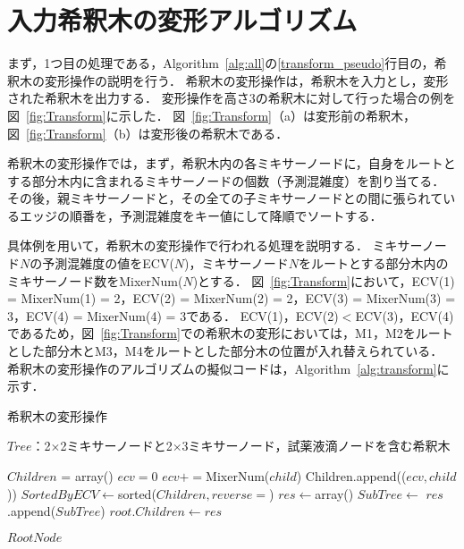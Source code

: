 \section{入力希釈木の変形アルゴリズム}
まず，1つ目の処理である，Algorithm~\ref{alg:all}の\ref{transform_pseudo}行目の，希釈木の変形操作の説明を行う． 希釈木の変形操作は，希釈木を入力とし，変形された希釈木を出力する． 変形操作を高さ3の希釈木に対して行った場合の例を図~\ref{fig:Transform}に示した．
図~\ref{fig:Transform}（a）は変形前の希釈木，図~\ref{fig:Transform}（b）は変形後の希釈木である．

希釈木の変形操作では，まず，希釈木内の各ミキサーノードに，自身をルートとする部分木内に含まれるミキサーノードの個数（予測混雑度）を割り当てる．
その後，親ミキサーノードと，その全ての子ミキサーノードとの間に張られているエッジの順番を，予測混雑度をキー値にして降順でソートする． 

具体例を用いて，希釈木の変形操作で行われる処理を説明する．
ミキサーノード$N$の予測混雑度の値をECV($N$)，ミキサーノード$N$をルートとする部分木内のミキサーノード数をMixerNum($\mathit{N}$)とする．
図~\ref{fig:Transform}において，ECV(1) = MixerNum(1) = 2，ECV(2) = MixerNum(2) = 2，ECV(3) = MixerNum(3) = 3，ECV(4) = MixerNum(4) = 3である．
ECV(1)，ECV(2)$<$ECV(3)，ECV(4)であるため，図~\ref{fig:Transform}での希釈木の変形においては，M1，M2をルートとした部分木とM3，M4をルートとした部分木の位置が入れ替えられている．
希釈木の変形操作のアルゴリズムの擬似コードは，Algorithm~\ref{alg:transform}に示す．




\begin{algorithm}[tbp]
 \caption{希釈木の変形操作}\label{alg:transform}
 \begin{algorithmic}[1]
     \Require $\mathit{Tree}$：2$\times$2ミキサーノードと2$\times$3ミキサーノード，試薬液滴ノードを含む希釈木 

        \State $\mathit{Children}$ = array()
            \State $\mathit{ecv}=0$
                \State $\mathit{ecv}+=$MixerNum($child$) 
            \EndIf 
            \State Children.append(($\mathit{ecv,child}$))
        \EndFor 
        \State $\mathit{SortedByECV} \gets $sorted($Children,reverse=$\True)
        \State $\mathit{res}\gets$array()
            \State $\mathit{SubTree}\gets $
            \State $\mathit{res}$.append($\mathit{SubTree}$)
        \EndFor 
        \State $\mathit{root.Children}\gets \mathit{res}$ 

        \Return $\mathit{RootNode}$
    \EndFunction 

 \end{algorithmic}
\end{algorithm}

